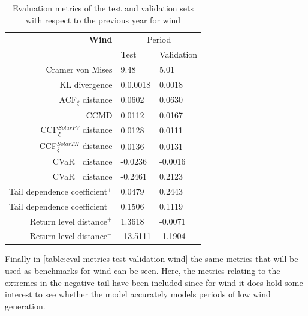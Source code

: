 \begin{table}[ht]
    \centering
    \begin{tabular}{rll}
        \toprule
        \textbf{Wind} & \multicolumn{2}{c}{Period} \\ 
        \cmidrule(lr){2-3}
            & Test & Validation \\
        \midrule
        Cramer von Mises & 9.48 & 5.01 \\
        KL divergence & 0.0.0018 & 0.0018 \\
        ACF$_\xi$ distance & 0.0602 & 0.0630 \\
        \midrule
        CCMD & 0.0112 & 0.0167 \\
        CCF$_\xi^{Solar PV}$ distance & 0.0128 & 0.0111 \\
        CCF$_\xi^{Solar TH}$ distance & 0.0136 & 0.0131 \\
        \midrule
        CVaR$^+$ distance & -0.0236 & -0.0016 \\
        CVaR$^-$ distance & -0.2461 & 0.2123 \\
        Tail dependence coefficient$^+$ & 0.0479 & 0.2443 \\
        Tail dependence coefficient$^-$ & 0.1506 & 0.1119 \\
        Return level distance$^+$ & 1.3618 & -0.0071 \\
        Return level distance$^-$ & -13.5111 & -1.1904 \\
        \bottomrule
    \end{tabular}
    \caption{Evaluation metrics of the test and validation sets with respect to the previous year for wind}
    \label{table:eval-metrics-test-validation-wind}
\end{table}

Finally in \autoref{table:eval-metrics-test-validation-wind} the same metrics that will be used as benchmarks for wind can be seen. Here, the metrics relating to the extremes in the negative tail have been included since for wind it does hold some interest to see whether the model accurately models periods of low wind generation.